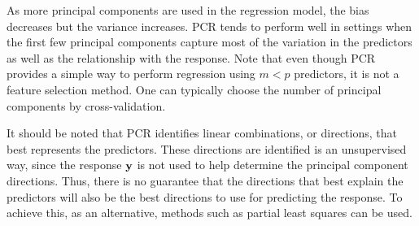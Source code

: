 As more principal components are used in the regression model, the bias decreases but the variance increases.
PCR tends to perform well in settings when the first few principal components capture most of the variation in the predictors as well as the relationship with the response.
Note that even though PCR provides a simple way to perform regression using $m < p$ predictors, it is not a feature selection method.
One can typically choose the number of principal components by cross-validation.

It should be noted that PCR identifies linear combinations, or directions, that best represents the predictors.
These directions are identified is an unsupervised way, since the response $\mathbf{y}$ is not used to help determine the principal component directions.
Thus, there is no guarantee that the directions that best explain the predictors will also be the best directions to use for predicting the response. To achieve this, as an alternative, methods such as partial least squares can be used.
